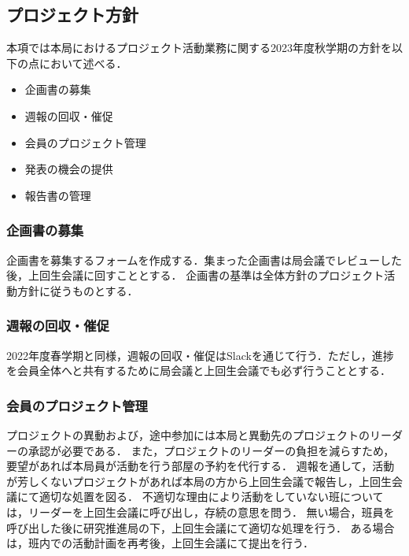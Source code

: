 \subsection*{プロジェクト方針}


本項では本局におけるプロジェクト活動業務に関する2023年度秋学期の方針を以下の点において述べる．

\begin{itemize}
    \item 企画書の募集
    \item 週報の回収・催促
    \item 会員のプロジェクト管理
    \item 発表の機会の提供
    \item 報告書の管理
\end{itemize}
  
\subsubsection*{企画書の募集}
  
企画書を募集するフォームを作成する．集まった企画書は局会議でレビューした後，上回生会議に回すこととする．
企画書の基準は全体方針のプロジェクト活動方針に従うものとする．
  
\subsubsection*{週報の回収・催促}
  
2022年度春学期と同様，週報の回収・催促はSlackを通じて行う．ただし，進捗を会員全体へと共有するために局会議と上回生会議でも必ず行うこととする．
  
\subsubsection*{会員のプロジェクト管理}
  
プロジェクトの異動および，途中参加には本局と異動先のプロジェクトのリーダーの承認が必要である．
また，プロジェクトのリーダーの負担を減らすため，要望があれば本局員が活動を行う部屋の予約を代行する．
週報を通して，活動が芳しくないプロジェクトがあれば本局の方から上回生会議で報告し，上回生会議にて適切な処置を図る．
不適切な理由により活動をしていない班については，リーダーを上回生会議に呼び出し，存続の意思を問う．
無い場合，班員を呼び出した後に研究推進局の下，上回生会議にて適切な処理を行う．
ある場合は，班内での活動計画を再考後，上回生会議にて提出を行う．
  
